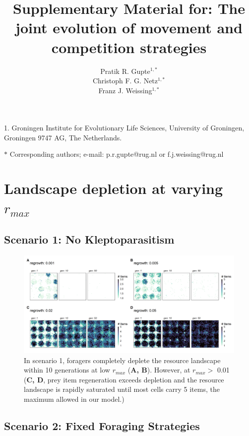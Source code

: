 \documentclass[11pt]{article}
\title{Supplementary Material for: The joint evolution of movement and competition strategies}
\author{Pratik R. Gupte$^{1,\ast}$ \\ 
        Christoph F. G. Netz$^{1,\ast}$ \\ 
        Franz J. Weissing$^{1, \ast}$}
\date{}
\begin{document}
\maketitle

\noindent{} 1. Groningen Institute for Evolutionary Life Sciences, University of Groningen, Groningen 9747 AG, The Netherlands.

\noindent{} $\ast$ Corresponding authors; e-mail: p.r.gupte@rug.nl or f.j.weissing@rug.nl

\bigskip

\section{Landscape depletion at varying $r_{max}$}

\newpage

\subsection{Scenario 1: No Kleptoparasitism}

\begin{figure}[h!]
        \centering
        \includegraphics*[width=1.0\textwidth]{figures/fig_landscape_rmax_foragers.png}
        \caption{In scenario 1, foragers completely deplete the resource landscape within 10 generations at low $r_{max}$ (\textbf{A, B}).
        However, at $r_{max} >$ 0.01 (\textbf{C, D}, prey item regeneration exceeds depletion and the resource landscape is rapidly saturated until most cells carry 5 items, the maximum allowed in our model.)}
\end{figure}

\subsection{Scenario 2: Fixed Foraging Strategies}
\end{document}
